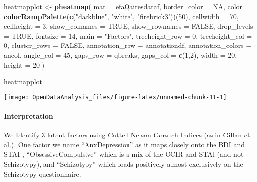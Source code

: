 \documentclass[]{article}
\newenvironment{Shaded}{\begin{snugshade}}{\end{snugshade}}
\newcommand{\KeywordTok}[1]{\textcolor[rgb]{0.13,0.29,0.53}{\textbf{#1}}}
\newcommand{\DataTypeTok}[1]{\textcolor[rgb]{0.13,0.29,0.53}{#1}}
\newcommand{\DecValTok}[1]{\textcolor[rgb]{0.00,0.00,0.81}{#1}}
\newcommand{\StringTok}[1]{\textcolor[rgb]{0.31,0.60,0.02}{#1}}
\newcommand{\OtherTok}[1]{\textcolor[rgb]{0.56,0.35,0.01}{#1}}
\newcommand{\NormalTok}[1]{#1}
\let\oldparagraph\paragraph
\renewcommand{\paragraph}[1]{\oldparagraph{#1}\mbox{}}
\begin{document}
\begin{Shaded}
\begin{Highlighting}[]
\NormalTok{heatmapplot <-}\StringTok{ }\KeywordTok{pheatmap}\NormalTok{(}
  \DataTypeTok{mat               =}\NormalTok{ efaQairesdataf,}
  \DataTypeTok{border_color      =} \OtherTok{NA}\NormalTok{,}
  \DataTypeTok{color             =} \KeywordTok{colorRampPalette}\NormalTok{(}\KeywordTok{c}\NormalTok{(}\StringTok{"darkblue"}\NormalTok{, }\StringTok{"white"}\NormalTok{, }\StringTok{"firebrick3"}\NormalTok{))(}\DecValTok{50}\NormalTok{),}
  \DataTypeTok{cellwidth         =} \DecValTok{70}\NormalTok{,}
  \DataTypeTok{cellheight        =} \DecValTok{3}\NormalTok{,}
  \DataTypeTok{show_colnames     =} \OtherTok{TRUE}\NormalTok{,}
  \DataTypeTok{show_rownames     =} \OtherTok{FALSE}\NormalTok{,}
  \DataTypeTok{drop_levels       =} \OtherTok{TRUE}\NormalTok{,}
  \DataTypeTok{fontsize          =} \DecValTok{14}\NormalTok{,}
  \DataTypeTok{main              =} \StringTok{"Factors"}\NormalTok{,}
  \DataTypeTok{treeheight_row    =} \DecValTok{0}\NormalTok{, }
  \DataTypeTok{treeheight_col    =} \DecValTok{0}\NormalTok{,}
  \DataTypeTok{cluster_rows      =} \OtherTok{FALSE}\NormalTok{,}
  \DataTypeTok{annotation_row    =}\NormalTok{ annotationdf,}
  \DataTypeTok{annotation_colors =}\NormalTok{ ancol,}
  \DataTypeTok{angle_col         =} \DecValTok{45}\NormalTok{,}
  \DataTypeTok{gaps_row          =}\NormalTok{ qbreaks,}
  \DataTypeTok{gaps_col          =} \KeywordTok{c}\NormalTok{(}\DecValTok{1}\NormalTok{,}\DecValTok{2}\NormalTok{),}
  \DataTypeTok{width             =} \DecValTok{20}\NormalTok{, }
    \DataTypeTok{height            =} \DecValTok{20}
\NormalTok{)}


\NormalTok{heatmapplot}
\end{Highlighting}
\end{Shaded}

\begin{center}\texttt{[image: OpenDataAnalysis\_files/figure-latex/unnamed-chunk-11-1]} \end{center}

\paragraph{Interpretation}\label{interpretation-5}

We Identify 3 latent factors using Cattell-Nelson-Gorsuch Indices (as in
Gillan et al.). One factor we name ``AnxDepression'' as it maps closely
onto the BDI and STAI , ``ObsessiveCompulsive'' which is a mix of the
OCIR and STAI (and not Schizotypy), and ``Schizotypy'' which loads
positively almost exclusively on the Schizotypy questionnaire.
\end{document}
